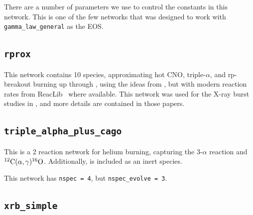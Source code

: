 There are a number of parameters we use to control the constants in
this network.  This is one of the few networks that was designed
to work with {\tt gamma\_law\_general} as the EOS.

\subsection{{\tt rprox}}

This network contains 10 species, approximating hot CNO,
triple-$\alpha$, and rp-breakout burning up through ,
using the ideas from \cite{wallacewoosley:1981}, but with modern
reaction rates from {\sf ReacLib}~\cite{ReacLib} where available.
This network was used for the X-ray burst studies in
\cite{xrb:II,xrb:III}, and more details are contained in those papers.


\subsection{{\tt triple\_alpha\_plus\_cago}}

This is a 2 reaction network for helium burning, capturing the $3$-$\alpha$
reaction and $\isotm{C}{12}(\alpha,\gamma)\isotm{O}{16}$.  Additionally,
 is included as an inert species.

This network has {\tt nspec = 4}, but {\tt nspec\_evolve = 3}.



\subsection{{\tt xrb\_simple}}

